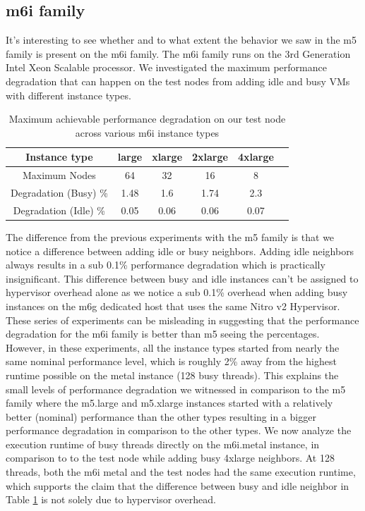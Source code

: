 \subsection{m6i family}
It's interesting to see whether and to what extent the behavior we saw in the m5 family is present on 
the m6i family. The m6i family runs on the 3rd Generation Intel Xeon Scalable processor. 
We investigated the maximum performance degradation that can happen on the test nodes from adding 
idle and busy VMs with different instance types. 
\begin{table}[H]
\begin{center}
\begin{tabular}{ |c|c|c|c|c|c }
 Instance type & large & xlarge & 2xlarge & 4xlarge \\
 \hline
 Maximum Nodes & 64 & 32 & 16 & 8  \\
 \hline
Degradation (Busy) \% & 1.48 & 1.6 & 1.74 & 2.3  \\ 
\hline 
Degradation (Idle) \% & 0.05 & 0.06 & 0.06 & 0.07  \\ 
\end{tabular}
\end{center}
\caption{Maximum achievable performance degradation on our test node across various m6i instance types}
\label{tab::max_m6i}
\end{table}
\noindent
The difference from the previous experiments with the m5 family is that we notice a difference between 
adding idle or busy neighbors. Adding idle neighbors always results in a sub 0.1\% performance 
degradation which is practically insignificant. This difference between busy and idle instances can't be 
assigned to hypervisor overhead alone as we notice a sub 0.1\% overhead when adding busy instances
on the m6g dedicated host that uses the same Nitro v2 Hypervisor.\\
These series of experiments can be misleading in 
suggesting that the performance degradation for the m6i family is better than m5 seeing the percentages. 
However, in these experiments, all the instance types started from nearly the same nominal performance 
level, which is roughly 2\% away from the highest runtime possible on the metal instance (128 busy 
threads). This explains the small levels of performance degradation we witnessed in comparison to the m5 family 
where the m5.large and m5.xlarge instances started with a relatively better (nominal) performance than 
the other types resulting in a bigger performance degradation in comparison to the other types. 
We now analyze the execution runtime of busy threads directly on the m6i.metal instance, in comparison
to to the test node while adding busy 4xlarge neighbors. At 128 threads, both the m6i metal and the 
test nodes had the same execution runtime, which supports the claim that the difference between 
busy and idle neighbor in Table \ref{tab::max_m6i} is not solely due to hypervisor overhead.  

